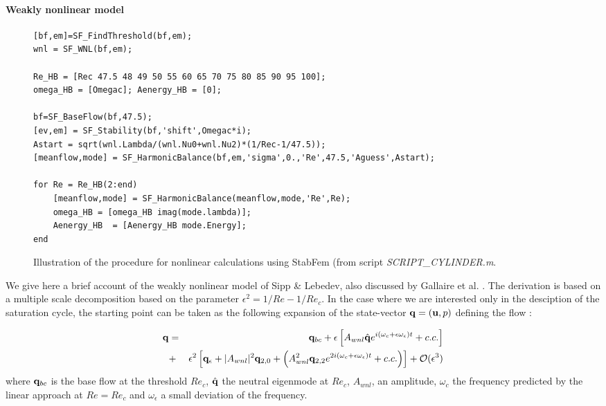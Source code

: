 \documentclass[twocolumn,10pt]{asme2ej}
\begin{document}




\paragraph{Weakly nonlinear model}

\begin{figure}
\small
\begin{lstlisting}
[bf,em]=SF_FindThreshold(bf,em);
wnl = SF_WNL(bf,em);

Re_HB = [Rec 47.5 48 49 50 55 60 65 70 75 80 85 90 95 100];
omega_HB = [Omegac]; Aenergy_HB = [0]; 

bf=SF_BaseFlow(bf,47.5);
[ev,em] = SF_Stability(bf,'shift',Omegac*i);
Astart = sqrt(wnl.Lambda/(wnl.Nu0+wnl.Nu2)*(1/Rec-1/47.5));
[meanflow,mode] = SF_HarmonicBalance(bf,em,'sigma',0.,'Re',47.5,'Aguess',Astart);

for Re = Re_HB(2:end)
    [meanflow,mode] = SF_HarmonicBalance(meanflow,mode,'Re',Re);
    omega_HB = [omega_HB imag(mode.lambda)];
    Aenergy_HB  = [Aenergy_HB mode.Energy];
end

\end{lstlisting}
\normalsize
\caption{Illustration of the procedure for nonlinear calculations using StabFem (from script {\em SCRIPT\_CYLINDER.m}. }
\label{fig:listingNL}
\end{figure}

We give here a brief account of the weakly nonlinear model of Sipp \& 
Lebedev\cite{SippLebedev}, also discussed by Gallaire et al. \cite{FDR2016}. 
The derivation is based on a multiple scale  decomposition based on the parameter $\epsilon^2 = 1/Re - 1/Re_c$. 
In the case where we are interested only in the desciption of the saturation cycle, the starting point can be taken as the following expansion of the state-vector ${\bf{q}}=({\bf{u}},p)$ defining the flow :

\begin{eqnarray}
{\bf q} &=& {\bf q}_{bc} + \epsilon \left[ A_{wnl}  \hat{\bf q} e^{i (\omega_c+\epsilon \omega_\epsilon)  t} + c.c. \right] \label{WNL1}\\
&+& \epsilon^2 \left[ {\bf q}_\epsilon + |A_{wnl}|^2  {\bf q}_{2,0} + \left(  A_{wnl}^2 {\bf q}_{2,2} e^{2 i(\omega_c+\epsilon \omega_\epsilon)  t} + c.c. \right) \right] + {\cal O}( \epsilon ^3)
\nonumber
\label{eq:WNLdevelopment}
\end{eqnarray}
where ${\bf q}_{bc}$ is the base flow at the threshold $Re_c$, $\hat{\bf q}$ the neutral 
eigenmode at $Re_c$, $A_{wnl}$, an amplitude, $\omega_c$ the frequency predicted by the linear approach at $Re=Re_c$ and $\omega_\epsilon$ a small deviation of the frequency.
\end{document}
